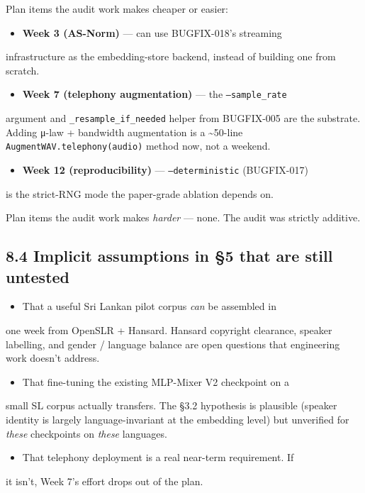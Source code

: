 \documentclass[10pt,a4paper]{article}
\begin{document}
Plan items the audit work makes cheaper or easier:
\begin{itemize}[leftmargin=*,itemsep=2pt]
  \item \textbf{Week 3 (AS-Norm)} --- can use BUGFIX-018's streaming
\end{itemize}
infrastructure as the embedding-store backend, instead of building one from scratch.
\begin{itemize}[leftmargin=*,itemsep=2pt]
  \item \textbf{Week 7 (telephony augmentation)} --- the \texttt{--sample\_rate}
\end{itemize}
argument and \texttt{\_resample\_if\_needed} helper from BUGFIX-005 are the substrate. Adding μ-law + bandwidth augmentation is a \textasciitilde{}50-line \texttt{AugmentWAV.telephony(audio)} method now, not a weekend.
\begin{itemize}[leftmargin=*,itemsep=2pt]
  \item \textbf{Week 12 (reproducibility)} --- \texttt{--deterministic} (BUGFIX-017)
\end{itemize}
is the strict-RNG mode the paper-grade ablation depends on.

Plan items the audit work makes \textit{harder} --- none. The audit was strictly additive.

\subsection*{8.4 Implicit assumptions in §5 that are still untested}

\begin{itemize}[leftmargin=*,itemsep=2pt]
  \item That a useful Sri Lankan pilot corpus \textit{can} be assembled in
\end{itemize}
one week from OpenSLR + Hansard. Hansard copyright clearance, speaker labelling, and gender / language balance are open questions that engineering work doesn't address.
\begin{itemize}[leftmargin=*,itemsep=2pt]
  \item That fine-tuning the existing MLP-Mixer V2 checkpoint on a
\end{itemize}
small SL corpus actually transfers. The §3.2 hypothesis is plausible (speaker identity is largely language-invariant at the embedding level) but unverified for \textit{these} checkpoints on \textit{these} languages.
\begin{itemize}[leftmargin=*,itemsep=2pt]
  \item That telephony deployment is a real near-term requirement. If
\end{itemize}
it isn't, Week 7's effort drops out of the plan.
\end{document}
